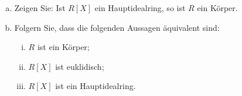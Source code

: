 \documentclass{article}
\begin{document}
\begin{enumerate}[(a)]
        Wir nehmen an $f$ sei nicht unzerlegbar, dann gibt es\\
        $f:=a_0+a_1+\hdots+a_nx^n,g:=b_0+b_1x+\hdots+b_lx^l$ mit $f,g\notin R^*$ und $f\neq 0,g\neq 0$.
        Wir nehmen an, für ein $i\geq 2$ ist $a_i\geq 1$, dann ist $\deg(f\cdot g)=\deg(f)+\deg(g)=i+\deg(g)\geq i>\deg(X)$.
        Demnach ist $a_i=0(i\geq 2)$, wie auch $b_j=0(j\geq 2)$.\\
        Nehmen wir nun weiter an, es sei $a_1\geq 1,b_1\geq 1$, dann ist
        $\deg(f\cdot g)=1+1=2>\deg(X)$. Demnach ist entweder $a_1=0$ oder $b_1=0$\\
        Wir nehmen OBDA an, $b_1=0$.
        Dann ist $f=a_0+a_1X,g=b_0$, also
        \begin{align*}
            X=f\cdot g&=\underbrace{a_0b_0}_{=0}+b_0a_1X\\
            \Rightarrow 1&=b_0a_1\\
            \Rightarrow a_1=(b_0)^{-1}=g^{-1}\\
            \Rightarrow g^{-1}\in R*
        \end{align*}
        Dies ist ein Widerspruch zur Annahme $\Rightarrow X$ ist unzerlegbar in $R[X]$.
    \item
        \color{blue}
        Zeigen Sie: Ist $R[X]$ ein Hauptidealring, so ist $R$ ein Körper.
        \color{black}
    \item
        \color{blue}
        Folgern Sie, dass die folgenden Aussagen äquivalent sind:
        \color{black}
        \begin{enumerate}[(i)]
            \item
                \color{blue}
                $R$ ist ein Körper;
                \color{black}
            \item
                \color{blue}
                $R[X]$ ist euklidisch;
                \color{black}
            \item
                \color{blue}
                $R[X]$ ist ein Hauptidealring.
                \color{black}
        \end{enumerate}
\end{enumerate}
\end{document}
